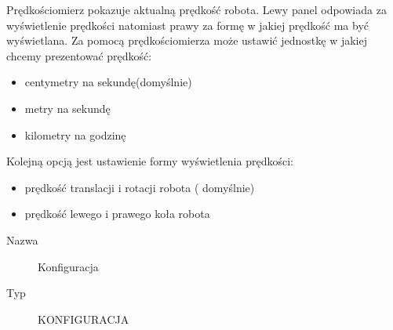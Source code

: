 \documentclass[eng,printmode]{mgr}
\begin{document}
Prędkościomierz pokazuje aktualną prędkość robota. Lewy panel odpowiada za wyświetlenie prędkości natomiast prawy za formę w jakiej prędkość ma być wyświetlana. Za pomocą prędkościomierza może ustawić jednostkę w jakiej chcemy prezentować  prędkość:
\begin{itemize}
 \item centymetry na sekundę(domyślnie)
 \item metry na sekundę 
 \item kilometry na godzinę
\end{itemize}
Kolejną opcją jest ustawienie formy wyświetlenia prędkości:
\begin{itemize}
 \item prędkość translacji i rotacji robota ( domyślnie)
 \item prędkość lewego i prawego koła robota
\end{itemize}

\newpage
\begin{description}
  \item[Nazwa] Konfiguracja
  \item[Typ] KONFIGURACJA
\end{description}
\end{document}
